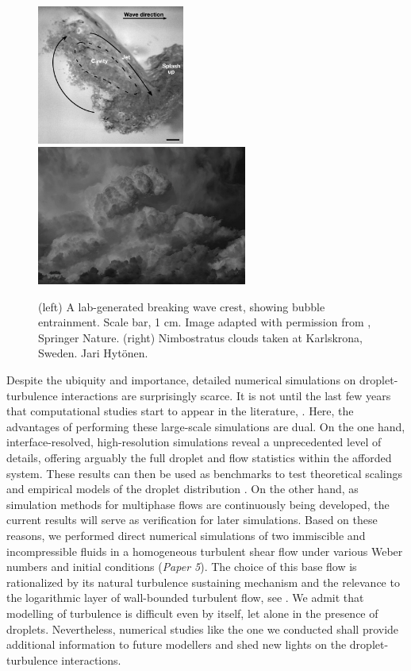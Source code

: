 \begin{figure}%
  \centering
  \includegraphics[height=4.57cm]{ocean_wave.png}
  \includegraphics[height=4.57cm]{nimbus_cloud.png}
  \caption{(left) A lab-generated breaking wave crest, showing bubble entrainment. Scale bar, 1 cm. Image adapted with permission from \cite{deane_stokes_2002a}, \textcopyright \enspace Springer Nature. (right) Nimbostratus clouds taken at Karlskrona, Sweden. \textcopyright \enspace Jari Hyt\"onen.}
  \label{fig:wave-cloud}
\end{figure}

Despite the ubiquity and importance, detailed numerical simulations on droplet-turbulence interactions are surprisingly scarce. It is not until the last few years that computational studies start to appear in the literature, \eg \cite{perlekar_biferale_sbragaglia_srivastava_toschi_2012a, skartlien_sollum_schumann_2013a, komrakova_eskin_derksen_2015a, scarbolo_bianco_soldati_2015a, dodd_ferrante_2016a}.
Here, the advantages of performing these large-scale simulations are dual.
On the one hand, interface-resolved, high-resolution simulations reveal a unprecedented level of details, offering arguably the full droplet and flow statistics within the afforded system. These results can then be used as benchmarks to test theoretical scalings and empirical models of the droplet distribution \citep{hinze_1955a, deane_stokes_2002a}.
On the other hand, as simulation methods for multiphase flows are continuously being developed, the current results will serve as verification for later simulations.
Based on these reasons, we performed direct numerical simulations of two immiscible and incompressible fluids in a homogeneous turbulent shear flow under various Weber numbers and initial conditions (\emph{Paper 5}).
The choice of this base flow is rationalized by its natural turbulence sustaining mechanism and the relevance to the logarithmic layer of wall-bounded turbulent flow, see \eg \cite{pumir_1996a, sekimoto_dong_jimenez_2016a}.
We admit that modelling of turbulence is difficult even by itself, let alone in the presence of droplets.
Nevertheless, numerical studies like the one we conducted shall provide additional information to future modellers and shed new lights on the droplet-turbulence interactions.



